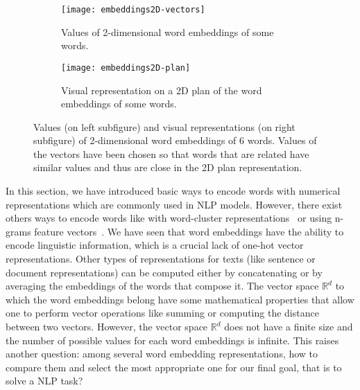   \begin{figure}[b!]
    \centering
    \begin{subfigure}[b]{0.38\textwidth}
      \centering
      \texttt{[image: embeddings2D-vectors]}
      \caption{Values of 2-dimensional word embeddings of some words.}
      \label{ch01:subfig:values-embeddings-2D}
    \end{subfigure} \hfill
    \begin{subfigure}[b]{0.58\textwidth}
      \centering
      \texttt{[image: embeddings2D-plan]}
      \caption{Visual representation on a 2D plan of the word embeddings of some
      words.}
      \label{ch01:subfig:plan-embeddings-2D}
    \end{subfigure}
    \caption[Values and visual representations of 2-dimensional word
    embeddings.] {Values (on left subfigure) and visual representations (on
    right subfigure) of 2-dimensional word embeddings of 6 words. Values of the
    vectors have been chosen so that words that are related have similar values
    and thus are close in the 2D plan representation.}
    \label{ch01:fig:word-embeddings-2D}
  \end{figure}

  In this section, we have introduced basic ways to encode words with numerical
  representations which are commonly used in NLP models. However, there exist
  others ways to encode words like with word-cluster
  representations~\citep{bekkerman2003distributional} or using n-grams feature
  vectors~\citep{cavnar1995using}. We have seen that word embeddings have the
  ability to encode linguistic information, which is a crucial lack of one-hot
  vector representations. Other types of representations for texts (like
  sentence or document representations) can be computed either by concatenating
  or by averaging the embeddings of the words that compose it. The vector space
  $\mathbb{R}^d$ to which the word embeddings belong have some mathematical
  properties that allow one to perform vector operations like summing or
  computing the distance between two vectors. However, the vector space
  $\mathbb{R}^d$ does not have a finite size and the number of possible values
  for each word embeddings is infinite. This raises another question: among
  several word embedding representations, how to compare them and select the
  most appropriate one for our final goal, that is to solve a NLP task?

